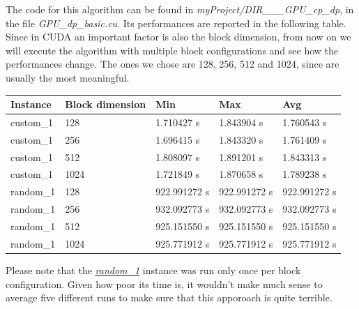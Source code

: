 \documentclass[12pt]{extarticle}
\begin{document}
The code for this algorithm can be found in \emph{myProject/DIR\_\_\_GPU\_cp\_dp}, in the file \emph{GPU\_dp\_basic.cu}.\newline
Its performances are reported in the following table. Since in CUDA an important factor is also the block dimension, from now on we will execute the algorithm with multiple block configurations and see how the performances change. The ones we chose are 128, 256, 512 and 1024, since are usually the most meaningful.
\begin{center}
\begin{tabular}{ | m{2.2cm} | m{3cm} | m{2.4cm} | m{2.4cm} | m{2.4cm} |}
 \hline
 Instance & Block dimension & Min & Max & Avg\\
 \hline
 custom\_1 & 128 & 1.710427 s & 1.843904 s & 1.760543 s\\
 \hline
 custom\_1 & 256 & 1.696415 s & 1.843320 s & 1.761409 s\\
 \hline
 custom\_1 & 512 & 1.808097 s & 1.891201 s & 1.843313 s\\
 \hline
 custom\_1 & 1024 & 1.721849 s & 1.870658 s & 1.789238 s\\
 \hline
 random\_1 & 128 & 922.991272 s & 922.991272 s & 922.991272 s\\
 \hline
 random\_1 & 256 & 932.092773 s & 932.092773 s & 932.092773 s\\
 \hline
 random\_1 & 512 & 925.151550 s & 925.151550 s & 925.151550 s\\
 \hline
 random\_1 & 1024 & 925.771912 s & 925.771912 s & 925.771912 s\\
 \hline
\end{tabular}
\end{center}
Please note that the \hyperref[random-1]{\emph{random\_1}} instance was run only once per block configuration. Given how poor its time is, it wouldn't make much sense to average five different runs to make sure that this apporoach is quite terrible.\newline
\end{document}
